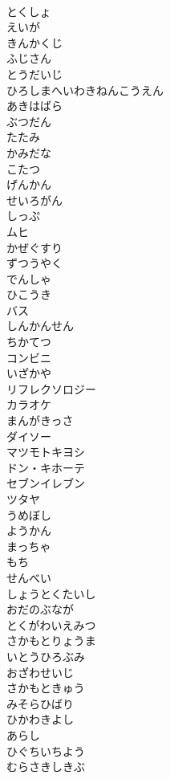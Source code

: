 \documentclass[8pt]{extreport}
\begin{document}
\begin{CJK}{UTF8}{min}
\\	とくしょ
\\	えいが
\\	きんかくじ
\\	ふじさん
\\	とうだいじ
\\	ひろしまへいわきねんこうえん
\\	あきはばら
\\	ぶつだん
\\	たたみ
\\	かみだな
\\	こたつ
\\	げんかん
\\	せいろがん
\\	しっぷ
\\	ムヒ
\\	かぜぐすり
\\	ずつうやく
\\	でんしゃ
\\	ひこうき
\\	バス
\\	しんかんせん
\\	ちかてつ
\\	コンビニ
\\	いざかや
\\	リフレクソロジー
\\	カラオケ
\\	まんがきっさ
\\	ダイソー
\\	マツモトキヨシ
\\	ドン・キホーテ
\\	セブンイレブン
\\	ツタヤ
\\	うめぼし
\\	ようかん
\\	まっちゃ
\\	もち
\\	せんべい
\\	しょうとくたいし
\\	おだのぶなが
\\	とくがわいえみつ
\\	さかもとりょうま
\\	いとうひろぶみ
\\	おざわせいじ
\\	さかもときゅう
\\	みそらひばり
\\	ひかわきよし
\\	あらし
\\	ひぐちいちよう
\\	むらさきしきぶ

\end{CJK}
\end{document}
